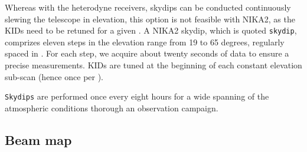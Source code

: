 Whereas with the heterodyne receivers, skydips can be
conducted continuously slewing the telescope in elevation, this
option is not feasible with NIKA2, as the KIDs need to be retuned
for a given \airmass. A NIKA2 skydip, which is quoted {\tt skydip},
comprizes eleven steps in the elevation range from 19 to 65 degrees,
regularly spaced in \airmass. For each step, we acquire about twenty
seconds of data to ensure a precise measurements. KIDs are tuned at
the beginning of each constant elevation sub-scan (hence once per
\airmass).

{\tt Skydips} {\lp are performed once every eight hours for a wide spanning
of the atmospheric conditions thorough an observation campaign.} 


%



\subsection{Beam map}
\label{se:beammaps}

